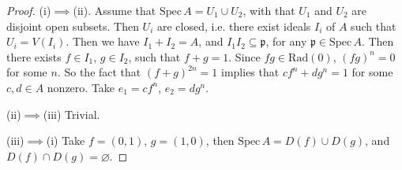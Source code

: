 \begin{proof}
	(i)$\implies$(ii). Assume that $\mathrm{Spec}\,A=U_1\cup U_2$, with that $U_1$ and $U_2$ are disjoint open subsets. Then $U_i$ are closed, i.e. there exist ideals $I_i$ of $A$ such that $U_i=V(I_i)$.
	Then we have $I_1+I_2=A$, and $I_1I_2\subseteq \mathfrak{p}$,  for any $\mathfrak{p}\in \mathrm{Spec}\,A$. Then there exists $f\in I_1$, $g\in I_2$, such that $f+g=1$. Since $fg\in \mathrm{Rad}(0)$,
	$(fg)^n=0$ for some $n$. So the fact that $(f+g)^{2n}=1$ implies that $cf^n+dg^n=1$ for some $c,d\in A$ nonzero. Take $e_1=cf^n$, $e_2=dg^n$.
	
	(ii)$\implies$(iii) Trivial.
	
	(iii)$\implies$(i) Take $f=(0,1)$, $g=(1,0)$, then $\mathrm{Spec}\,A= D(f)\cup D(g)$, and $D(f)\cap D(g)=\varnothing$.
\end{proof}
